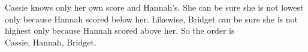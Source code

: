 Cassie knows only her own score and Hannah's. She can be sure she is not lowest only because Hannah scored below her. Likewise, Bridget can be sure she is not highest only because Hannah scored above her. So the order is $\boxed{\text{Cassie, Hannah, Bridget}}$.
